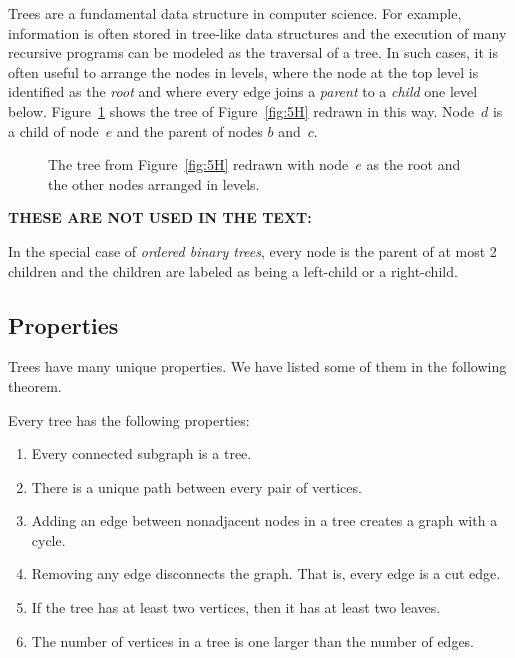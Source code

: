 Trees are a fundamental data structure in computer science.  For
example, information is often stored in tree-like data structures and
the execution of many recursive programs can be modeled as the
traversal of a tree.  In such cases, it is often useful to arrange the
nodes in levels, where the node at the top level is identified as
the \emph{root} and where every edge joins a \emph{parent} to a
\emph{child} one level below.  Figure~\ref{fig:5JJ} shows the tree of
Figure~\ref{fig:5H} redrawn in this way.  Node~$d$ is a child of
node~$e$ and the parent of nodes $b$ and~$c$.

\begin{figure}


\caption{The tree from Figure~\ref{fig:5H} redrawn with node~$e$ as
  the root and the other nodes arranged in levels.}

\label{fig:5JJ}
\end{figure}

\begin{editingnotes}
\textbf{THESE ARE NOT USED IN THE TEXT:}

In the special case of \emph{ordered binary trees}, every node is the
parent of at most 2 children and the children are labeled as being a
left-child or a right-child.
\end{editingnotes}

\subsection{Properties}

Trees have many unique properties.  We have listed some of them in the
following theorem.

\begin{theorem}\label{th:treeprops}
Every tree has the following properties:

\begin{enumerate}

\item Every connected subgraph is a tree.\label{treeprops:asub}

\item There is a unique path between every pair of vertices.\label{treeprops:uniquepath}

\item Adding an edge between nonadjacent nodes in a tree creates a
  graph with a cycle.

\item Removing any edge disconnects the graph.  That is, every edge is
  a cut edge.

\item If the tree has at least two vertices, then it has at least two
  leaves.

\item\label{treeprops:v=e+1} The number of vertices in a tree is one larger than the number
  of edges.

\end{enumerate}
\end{theorem}

